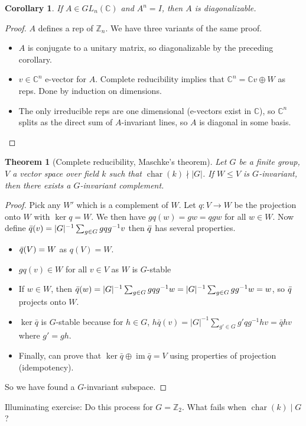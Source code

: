 \documentclass{article}
\theoremstyle{definition}
\theoremstyle{remark}
\theoremstyle{plain}
\newtheorem{thm}[defn]{Theorem}
\newtheorem{crly}[defn]{Corollary}
\newcommand{\ZZ}{\mathbb{Z}}
\newcommand{\CC}{\mathbb{C}}
\begin{document}
\begin{crly}
    If $A\in GL_n(\CC)$ and $A^n=I$, then $A$ is diagonalizable.
\end{crly}
\begin{proof}
    $A$ defines a rep of $\ZZ_n$. We have three variants of the same proof.
    \begin{itemize}
        \item $A$ is conjugate to a unitary matrix, so diagonalizable by the preceding corollary.
        \item $v\in\CC^n$ e-vector for $A$. Complete reducibility implies that $\CC^n=\CC v\oplus W$ as reps. Done by induction on dimensions.
        \item The only irreducible reps are one dimensional (e-vectors exist in $\CC$), so $\CC^n$ splits as the direct sum of $A$-invariant lines, so $A$ is diagonal in some basis.
    \end{itemize}
\end{proof}
\begin{thm}[Complete reducibility, Maschke's theorem]
    Let $G$ be a finite group, $V$ a vector space over field $k$ such that $\operatorname{char}(k)\nmid |G|$. If $W\le V$ is $G$-invariant, then there exists a $G$-invariant complement.
\end{thm}
\begin{proof}
    Pick any $W'$ which is a complement of $W$. Let $q:V\to W$ be the projection onto $W$ with $\ker q=W$. We then have $gq(w)=gw=qgw$ for all $w\in W$. Now define $\Bar{q}(v)=|G|^{-1}\sum_{g\in G}gqg^{-1}v$
    then $\Bar{q}$ has several properties.
    \begin{itemize}
        \item $\Bar{q}(V)=W$ as $q(V)=W$.
        \item $gq(v)\in W$ for all $v\in V$ as $W$ is $G$-stable
        \item If $w\in W$, then $\Bar{q}(w)=|G|^{-1}\sum_{g\in G}gqg^{-1}w=|G|^{-1}\sum_{g\in G}gg^{-1}w=w$, so $\Bar{q}$ projects onto $W$.
        \item $\ker\bar{q}$ is $G$-stable because for $h\in G$, $h\bar{q}(v)=|G|^{-1}\sum_{g'\in G}g'qg^{-1}hv=\bar{q}hv$ where $g'=gh$.
        \item Finally, can prove that $\ker\bar q\oplus\operatorname{im}\bar q=V$ using properties of projection (idempotency).
    \end{itemize}
    So we have found a $G$-invariant subspace.
\end{proof}
Illuminating exercise: Do this process for $G=\ZZ_2$.
What fails when $\operatorname{char}(k)\mid G$?
\end{document}
